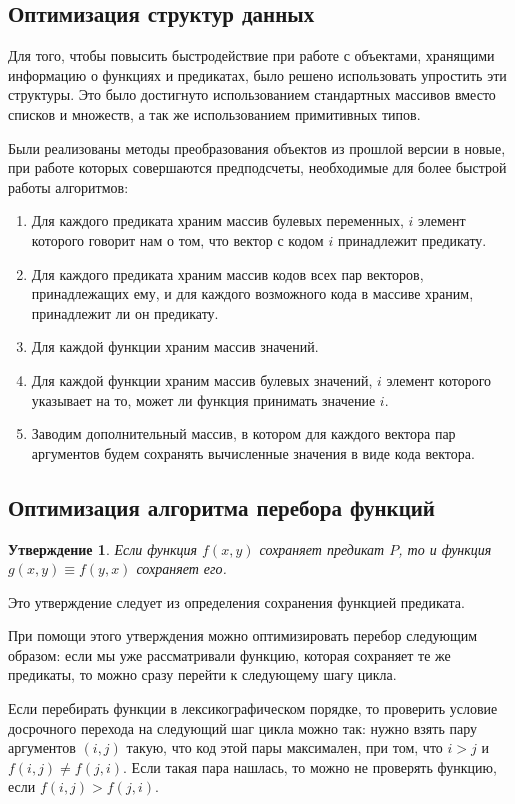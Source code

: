 \documentclass[a4paper,14pt]{extreport}
\newtheorem{utv}{Утверждение}
\begin{document}
\subsection{Оптимизация структур данных}
Для того, чтобы повысить быстродействие при работе с объектами, хранящими информацию о функциях и предикатах, было решено использовать упростить эти структуры. Это было достигнуто использованием стандартных массивов вместо списков и множеств, а так же использованием примитивных типов.

Были реализованы методы преобразования объектов из прошлой версии в новые, при работе которых совершаются предподсчеты, необходимые для более быстрой работы алгоритмов:
\begin{enumerate}
\item Для каждого предиката храним массив булевых переменных, $i$ элемент которого говорит нам о том, что вектор с кодом $i$ принадлежит предикату. 
\item Для каждого предиката храним массив кодов всех пар векторов, принадлежащих ему, и для каждого возможного кода в массиве храним, принадлежит ли он предикату.
\item Для каждой функции храним массив значений. 
\item Для каждой функции храним массив булевых значений, $i$ элемент которого указывает на то, может ли функция принимать значение $i$. 
\item Заводим дополнительный массив, в котором для каждого вектора пар аргументов будем сохранять вычисленные значения в виде кода вектора. 
\end{enumerate} 

\subsection{Оптимизация алгоритма перебора функций}
\begin{utv}
Если функция $f(x, y)$ сохраняет предикат $P$, то и функция $g(x, y) \equiv f(y, x)$ сохраняет его.
\end{utv}
Это утверждение следует из определения сохранения функцией предиката.

При помощи этого утверждения можно оптимизировать перебор следующим образом: если мы уже рассматривали функцию, которая сохраняет те же предикаты, то можно сразу перейти к следующему шагу цикла.

Если перебирать функции в лексикографическом порядке, то проверить условие досрочного перехода на следующий шаг цикла можно так: нужно взять пару аргументов $(i, j)$ такую, что код этой пары максимален, при том, что $i > j$ и $f(i, j) \neq f(j, i)$. Если такая пара нашлась, то можно не проверять функцию, если $f(i, j) > f(j, i)$.
\end{document}
